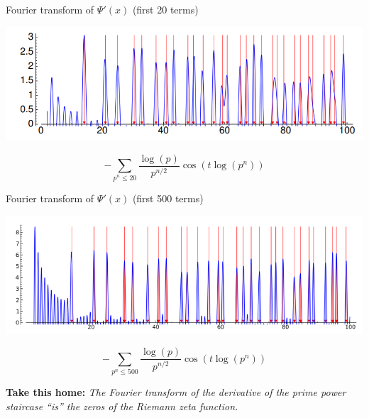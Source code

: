 \documentclass{beamer}
\begin{document}
\begin{frame}{Fourier transform of $\Psi'(x)$ (first 20 terms)}


  \includegraphics[height=.41\textheight]{pics/prime-power-freq-20}

  \vfill

  $$
  -\sum_{p^n\leq 20}{\frac{\log(p)}{p^{n/2}}}\cos(t\log(p^n))
  $$

\end{frame}


\begin{frame}{Fourier transform of $\Psi'(x)$ (first 500 terms)}

  \includegraphics[height=.43\textheight]{pics/prime-power-freq-500}
  \vfill

  $$
  -\sum_{p^n\leq 500}{\frac{\log(p)}{p^{n/2}}}\cos(t\log(p^n))
  $$

  {\bf Take this home:}
  {\em The Fourier transform of the derivative of the prime power staircase ``is'' the
  zeros of the Riemann zeta function.}

\end{frame}
\end{document}
